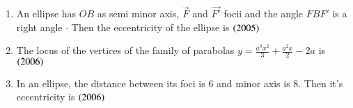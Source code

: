 \documentclass[journal,12pt,twocolumn]{IEEEtran}
\theoremstyle{remark}
\begin{document}
\begin{enumerate}
\begin{enumerate}
\end{enumerate}
\hfill
\item An ellipse has {$ OB $} as semi minor axis, {$\vec{F}$} and {$ \vec{F'} $} focii and the angle {$ FBF' $} is a right angle {$ \cdot $} Then the eccentricity of the ellipse is
\hfill
\hfill{{$ \left(2005\right) $}}
\begin{enumerate}
\end{enumerate}
\hfill
\item The locus of the vertices of the family of parabolas {$ y = \frac{a^3 x^2}{3} + \frac{a^2 x}{2} - 2a  $} is 
\hfill{{$ \left(2006\right) $}}
\begin{enumerate}	
\end{enumerate}
\hfill
\item In an ellipse, the distance between its foci is 6 and minor axis is 8. Then it's eccentricity is
\hfill
\hfill{{$ \left(2006\right) $}}
\begin{enumerate}
\end{enumerate}
\hfill

\end{enumerate}
\end{document}
